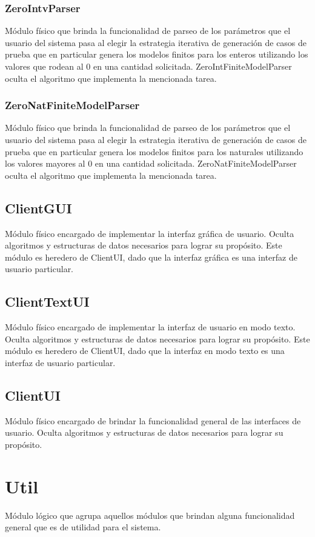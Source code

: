 \documentclass[a4paper,10pt]{report}
\begin{document}
			\subsubsection{ZeroIntvParser}
			Módulo físico que brinda la funcionalidad de parseo de los parámetros que el usuario del sistema pasa al elegir la estrategia iterativa de generación de casos de prueba que en particular genera los modelos finitos para los enteros utilizando los valores que rodean al 0 en una cantidad solicitada. ZeroIntFiniteModelParser oculta el algoritmo que implementa la mencionada tarea.
			\subsubsection{ZeroNatFiniteModelParser}
			Módulo físico que brinda la funcionalidad de parseo de los parámetros que el usuario del sistema pasa al elegir la estrategia iterativa de generación de casos de prueba que en particular genera los modelos finitos para los naturales utilizando los valores mayores al 0 en una cantidad solicitada. ZeroNatFiniteModelParser oculta el algoritmo que implementa la mencionada tarea.
		\subsection{ClientGUI}
		Módulo físico encargado de implementar la interfaz gráfica de usuario. Oculta algoritmos y estructuras de datos necesarios para lograr su propósito. Este módulo es heredero de ClientUI, dado que la interfaz gráfica es una interfaz de usuario particular.
		\subsection{ClientTextUI}
		Módulo físico encargado de implementar la interfaz de usuario en modo texto. Oculta algoritmos y estructuras de datos necesarios para lograr su propósito. Este módulo es heredero de ClientUI, dado que la interfaz en modo texto es una interfaz de usuario particular.
		\subsection{ClientUI}
		Módulo físico encargado de brindar la funcionalidad general de las interfaces de usuario. Oculta algoritmos y estructuras de datos necesarios para lograr su propósito.
	\section{Util}
	Módulo lógico que agrupa aquellos módulos que brindan alguna funcionalidad general que es de utilidad para el sistema.
\end{document}
